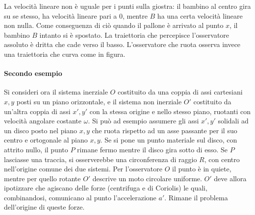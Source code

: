 \begin{figure}[htpb]
\end{figure}
\FloatBarrier
La velocità lineare non è uguale per i punti sulla giostra: il bambino al centro gira su se stesso, ha velocità lineare pari a $0$, mentre $B$ ha una certa velocità lineare non nulla. Come conseguenza di ciò quando il pallone è arrivato al punto $x$, il bambino $B$ intanto si è spostato. La traiettoria che percepisce l'osservatore assoluto è dritta che cade verso il basso. L'osservatore che ruota osserva invece una traiettoria che curva come in figura.

\paragraph{Secondo esempio} Si consideri ora il sistema inerziale $O$ costituito da una coppia di assi cartesiani $x, y$ posti su un piano orizzontale, e il sistema non inerziale $O'$ costituito da un'altra coppia di assi $x', y'$ con la stessa origine e nello stesso piano, ruotanti con velocità angolare costante $\omega$. Si può ad esempio assumere gli assi $x', y'$ solidali ad un disco posto nel piano $x, y$ che ruota rispetto ad un asse passante per il suo centro e ortogonale al piano $x, y$. Se si pone un punto materiale sul disco, con attrito nullo, il punto $P$ rimane fermo mentre il disco gira sotto di esso. Se $P$ lasciasse una traccia, si osserverebbe una circonferenza di raggio $R$, con centro nell'origine comune dei due sistemi. Per l'osservatore $O$ il punto è in quiete, mentre per quello rotante $O'$ descrive un moto circolare uniforme. $O'$ deve allora ipotizzare che agiscano delle forze (centrifuga e di Coriolis) le quali, combinandosi, comunicano al punto l'accelerazione $a'$. Rimane il problema dell'origine di queste forze.

